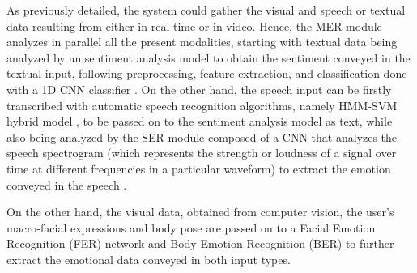 \documentclass[runningheads]{llncs}
\begin{document}

As previously detailed, the system could gather the visual and speech or textual data resulting from either in real-time or in video. Hence, the MER module analyzes in parallel all the present modalities, starting with textual data being analyzed by an sentiment analysis model to obtain the sentiment conveyed in the textual input, following preprocessing, feature extraction, and classification done with a 1D CNN classifier \cite{hung_beyond_2023}. On the other hand, the speech input can be firstly transcribed with automatic speech recognition algorithms, namely HMM-SVM hybrid model \cite{malik_automatic_2021}, to be passed on to the sentiment analysis model as text, while also being analyzed by the SER module composed of a CNN that analyzes the speech spectrogram (which represents the strength or loudness of a signal over time at different frequencies in a particular waveform) to extract the emotion conveyed in the speech \cite{Badshah2017}.

On the other hand, the visual data, obtained from computer vision, the user's macro-facial expressions and body pose are passed on to a Facial Emotion Recognition (FER) network and Body Emotion Recognition (BER) to further extract the emotional data conveyed in both input types.
\end{document}
